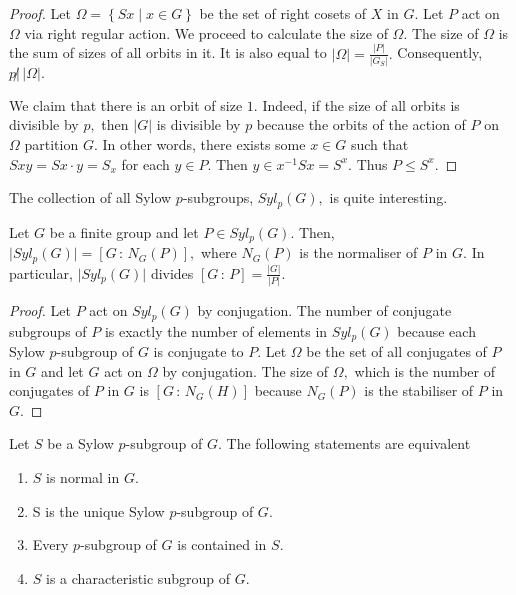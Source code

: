 \begin{proof}
	Let $ \Omega  =  \left\{ S x \; | \; x \in G  \right\}$
	be the set of right cosets of $X$ in $G.$
	Let $P$ act on $ \Omega $ via right regular  action.
	We proceed to calculate the size of $ \Omega.$
	The size of $ \Omega $ is the sum of sizes of all orbits in it. 
	It is also equal to $ \lvert \Omega \rvert = \frac{ \lvert P \rvert} { \lvert G_S \rvert}.$
	Consequently, $p \not | \, \lvert \Omega \rvert.$

	We claim that there is an orbit of size $1.$
	Indeed, if the size of all orbits is divisible by $p,$ then $ \lvert G \rvert $
	is divisible by $p $ because the orbits of the action of $P$
	on $ \Omega$ partition $G.$
	In other words, there exists some $x \in G$ such that $ S{xy} = S {x} \cdot y = S_x$
	for each $y \in P.$
	Then $y \in x^{-1} S x = S^x.$ Thus $ P\leq S^x.$
\end{proof}

The collection of all Sylow $p$\nobreakdash-subgroups, $Syl_p(G),$ is quite interesting.

\begin{corollary} \label{cor:number-of-sylow-p-groups}
	Let $G$ be a finite group and let $P \in Syl_p(G).$ Then, $ \lvert Syl_p(G) \rvert 
	= \left[ G \, : \, N_G(P) \right] ,$
	where $N_G(P) $ is the normaliser of $P$ in $G.$
	In particular, $ \lvert Syl_p(G) \rvert $ divides $ \left[ G \, : \, P \right] 
	= \frac{ \lvert G \rvert } { \lvert P \rvert }.$
\end{corollary}

\begin{proof}
	Let $P$ act on $Syl_p(G)$ by conjugation.
	The number of conjugate subgroups of $P$ is exactly the number of 
	elements in $Syl_p(G)$
	because each Sylow $p$\nobreakdash-subgroup of $G$ is conjugate to $P.$
	Let $ \Omega$ be the set of all conjugates of $P$ in $G$ and let 
	$G$ act on $ \Omega$ by conjugation.
	The size of $ \Omega ,$ which is the number of conjugates of $P$ in $G$ 
	is $ \left[ G \, : \, N_G(H) \right] $ because $N_G(P) $ is the
	stabiliser of $P$ in $G.$
\end{proof}

\begin{corollary}
	Let $ S$ be a Sylow $p$\nobreakdash-subgroup of $G.$
	The following statements are equivalent
	\begin{enumerate}
		\item $S$ is normal in $G.$
		\item S is the unique Sylow $p$\nobreakdash-subgroup of $G.$
		\item Every $p$\nobreakdash-subgroup of $G$ is contained in $S.$
		\item $S$ is a characteristic subgroup of $G.$
	\end{enumerate}
\end{corollary}

